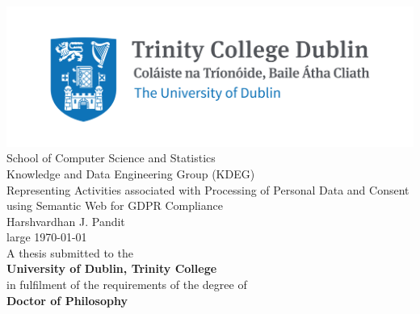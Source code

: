 \pagestyle{empty}
\begin{center}
    \includegraphics{img/TCD_logo.png}\\[1cm] 
\Large School of Computer Science and Statistics \\
\large Knowledge and Data Engineering Group (KDEG) \\[1.5cm]

\huge Representing Activities associated with Processing of Personal Data and Consent using Semantic Web for GDPR Compliance \\[1.5cm]
 
\Large Harshvardhan J. Pandit \\[2cm]

{large \today}\\[2cm] %

\normalsize
A thesis submitted to the \\
\textbf{University of Dublin, Trinity College} \\
in fulfilment of the requirements of the degree of \\
\textbf{Doctor of Philosophy}

\normalsize

\vfill %
\end{center}
\restoregeometry
